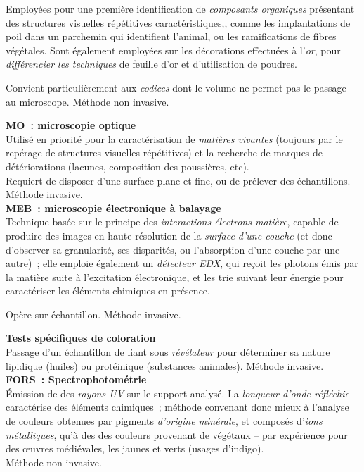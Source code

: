 \documentclass[a4paper,12pt, twoside]{book}
\begin{document}
\normalsize
Employées pour une première identification de \emph{composants organiques} présentant des structures visuelles répétitives caractéristiques,, comme les implantations de poil dans un parchemin qui identifient l’animal, ou les ramifications de fibres végétales. Sont également employées sur les décorations effectuées à l’\emph{or}, pour \emph{différencier les techniques} de feuille d’or et d’utilisation de poudres.

Convient particulièrement aux \textit{codices} dont le volume ne permet pas le passage au microscope. Méthode non invasive.

\large \textbf{\textcolor{teal2}{MO~: microscopie optique}}\\

\normalsize
Utilisé en priorité pour la caractérisation de \emph{matières vivantes} (toujours par le repérage de structures visuelles répétitives) et la recherche de marques de détériorations (lacunes, composition des poussières, etc).\\
Requiert de disposer d’une surface plane et fine, ou de prélever des échantillons. Méthode invasive.\\

\large \textbf{\textcolor{teal2}{MEB~: microscopie électronique à balayage}}\\

\normalsize
Technique basée sur le principe des \emph{interactions électrons-matière}, capable de produire des images en haute résolution de la \emph{surface d’une couche} (et donc d’observer sa granularité, ses disparités, ou l’absorption d’une couche par une autre)~; elle emploie également un \emph{détecteur EDX}, qui reçoit les photons émis par la matière suite à l’excitation électronique, et les trie suivant leur énergie pour caractériser les éléments chimiques en présence.

Opère sur échantillon. Méthode invasive.

\large \textbf{\textcolor{teal2}{Tests spécifiques de coloration}}\\

\normalsize
Passage d’un échantillon de liant sous \emph{révélateur} pour déterminer sa nature lipidique (huiles) ou protéinique (substances animales). Méthode invasive.\\

\large \textbf{\textcolor{teal2}{FORS~: Spectrophotométrie}}\\

\normalsize
Émission de des \emph{rayons UV} sur le support analysé. La \emph{longueur d’onde réfléchie} caractérise des éléments chimiques ; méthode convenant donc mieux à l’analyse de couleurs obtenues par pigments \emph{d’origine minérale}, et composés d’\emph{ions métalliques}, qu’à des des couleurs provenant de végétaux – par expérience pour des œuvres médiévales, les jaunes et verts (usages d’indigo).\\
 Méthode non invasive.
\end{document}

